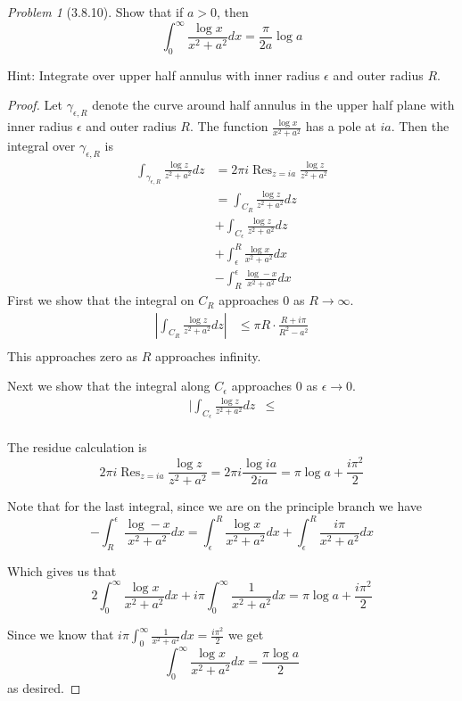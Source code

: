 \documentclass[10pt]{article}
\newcommand{\sk}{\vskip 10mm}
\DeclareMathOperator{\Res}{Res}
\theoremstyle{remark}
\newtheorem{problem}{Problem}
\theoremstyle{remark}
\begin{document}
\sk

\begin{problem}[3.8.10]
  Show that if $a>0$, then
  \[
    \int_0^\infty\frac{\log x}{x^2+a^2}dx=\frac{\pi}{2a}\log a
  \]

  Hint: Integrate over upper half annulus with inner radius $\epsilon$ and outer
  radius $R$.
\end{problem}

\begin{proof}
  Let $\gamma_{\epsilon,R}$ denote the curve around half annulus in the upper half plane with
  inner radius $\epsilon$ and outer radius $R$. The function $\frac{\log x}{x^2+a^2}$ has
  a pole at $ia$. Then the integral over $\gamma_{\epsilon,R}$ is
  \begin{align*}
    \int_{\gamma_{\epsilon,R}}\frac{\log z}{z^2+a^2} dz&= 2\pi i\Res_{z=ia}\frac{\log z}{z^2+a^2}\\
                                                    &= \int_{C_R}\frac{\log z}{z^2+a^2}dz \\
                                                    &+ \int_{C_\epsilon}\frac{\log z}{z^2+a^2}dz \\
                                                    &+ \int_\epsilon^R \frac{\log x}{x^2+a^2}dx\\
                                                    &-\int_{R}^{\epsilon}\frac{\log -x}{x^2+a^2}dx
  \end{align*}
  First we show that the integral on $C_R$ approaches $0$ as $R\rightarrow\infty$.
  \begin{align*}
    |\int_{C_R}\frac{\log z}{z^2+a^2}dz| &\leq \pi R\cdot \frac{R+i\pi}{R^2-a^2}\\
  \end{align*}
  This approaches zero as $R$ approaches infinity.

  Next we show that the integral along $C_\epsilon$ approaches $0$ as $\epsilon\rightarrow 0$.
  \begin{align*}
    |\int_{C_\epsilon}\frac{\log z}{z^2+a^2}dz & \leq \\
  \end{align*}
  
  The residue calculation is
  \[
    2\pi i\Res_{z=ia}\frac{\log z}{z^2+a^2}= 2\pi i\frac{\log ia}{2ia} = \pi\log a+\frac{i\pi^2}{2}
  \]

  Note that for the last integral, since we are on the principle branch we have
  \[
    -\int_{R}^{\epsilon}\frac{\log -x}{x^2+a^2}dx =\int_\epsilon^R\frac{\log x}{x^2+a^2}dx+\int_\epsilon^R\frac{i\pi}{x^2+a^2}dx
  \]
  
  Which gives us that
  \[
    2\int_0^\infty\frac{\log x}{x^2+a^2}dx+i\pi\int_0^\infty\frac{1}{x^2+a^2}dx = \pi\log a+\frac{i\pi^2}{2}
  \]

  Since we know that $i\pi\int_0^\infty\frac{1}{x^2+a^2}dx = \frac{i\pi^2}{2}$ we get
  \[
    \int_0^\infty\frac{\log x}{x^2+a^2}dx=\frac{\pi\log a}{2}
  \]
  as desired.
\end{proof}
\end{document}
